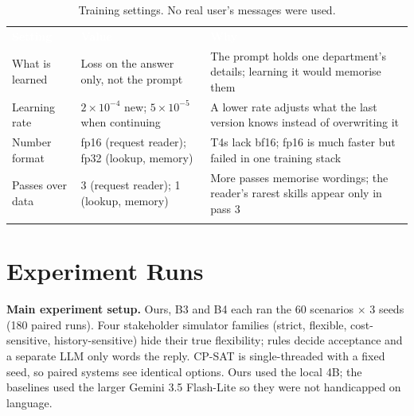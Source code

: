 \documentclass[10pt,a4paper]{article}
\newcommand{\hdr}{\rowcolor{secblue}}
\newcommand{\hd}[1]{\textcolor{white}{\textbf{#1}}}
\begin{document}
\begin{table}[H]
\centering\footnotesize
{}\begin{tabularx}{\textwidth}{l l Y}
\toprule{}
\hdr \hd{Setting} & \hd{Value} & \hd{Why}\\
\midrule{}
What is learned & Loss on the answer only, not the prompt & The prompt holds one department's details; learning it would memorise them\\
Learning rate & $2{\times}10^{-4}$ new; $5{\times}10^{-5}$ when continuing & A lower rate adjusts what the last version knows instead of overwriting it\\
Number format & fp16 (request reader); fp32 (lookup, memory) & T4s lack bf16; fp16 is much faster but failed in one training stack\\
Passes over data & 3 (request reader); 1 (lookup, memory) & More passes memorise wordings; the reader's rarest skills appear only in pass 3\\
\bottomrule{}
\end{tabularx}
\caption{Training settings. No real user's messages were used.}
\label{tab:train}
\end{table}

\section{Experiment Runs}
\label{sec:runs}
\textbf{Main experiment setup.} Ours, B3 and B4 each ran the 60 scenarios
$\times$ 3 seeds (180 paired runs). Four stakeholder simulator families
(strict, flexible, cost-sensitive, history-sensitive) hide their true
flexibility; rules decide acceptance and a separate LLM only words the reply.
CP-SAT is single-threaded with a fixed seed, so paired systems see identical
options. Ours used the local 4B; the baselines used the larger Gemini 3.5
Flash-Lite so they were not handicapped on language.
\end{document}
